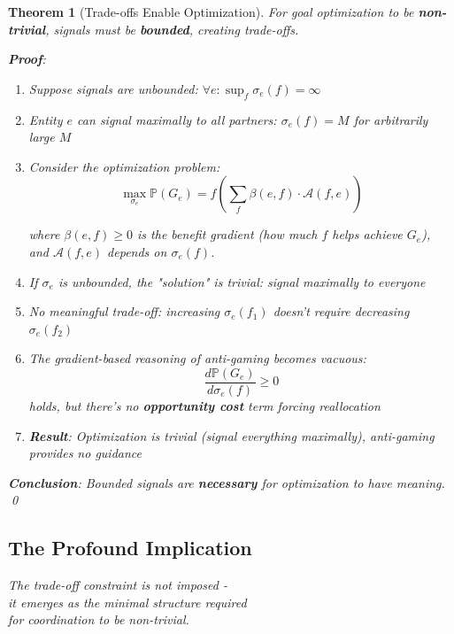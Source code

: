 \documentclass[11pt,a4paper]{article}
\newtheorem{theorem}{Theorem}[section]
\theoremstyle{definition}
\theoremstyle{remark}
\newcommand{\A}{\mathcal{A}}
\begin{document}
\begin{theorem}[Trade-offs Enable Optimization]
\label{thm:tradeoffs-necessary}
For goal optimization to be \textbf{non-trivial}, signals must be \textbf{bounded}, creating trade-offs.

\textbf{Proof}:
\begin{enumerate}
\item Suppose signals are unbounded: $\forall e: \sup_f \sigma_e(f) = \infty$

\item Entity $e$ can signal maximally to all partners: $\sigma_e(f) = M$ for arbitrarily large $M$

\item Consider the optimization problem:
\[ \max_{\sigma_e} \mathbb{P}(G_e) = f\left(\sum_f \beta(e,f) \cdot \A(f,e)\right) \]

where $\beta(e,f) \ge 0$ is the benefit gradient (how much $f$ helps achieve $G_e$), and $\A(f,e)$ depends on $\sigma_e(f)$.

\item If $\sigma_e$ is unbounded, the "solution" is trivial: signal maximally to everyone

\item No meaningful trade-off: increasing $\sigma_e(f_1)$ doesn't require decreasing $\sigma_e(f_2)$

\item The gradient-based reasoning of anti-gaming becomes vacuous:
\[ \frac{d\mathbb{P}(G_e)}{d\sigma_e(f)} \ge 0 \]
holds, but there's no \textbf{opportunity cost} term forcing reallocation

\item \textbf{Result}: Optimization is trivial (signal everything maximally), anti-gaming provides no guidance
\end{enumerate}

\textbf{Conclusion}: Bounded signals are \textbf{necessary} for optimization to have meaning. \qed
\end{theorem}

\subsection{The Profound Implication}

\begin{center}
\large
\textit{The trade-off constraint is not imposed - }\\
\textit{it emerges as the minimal structure required}\\
\textit{for coordination to be non-trivial.}
\end{center}
\end{document}
